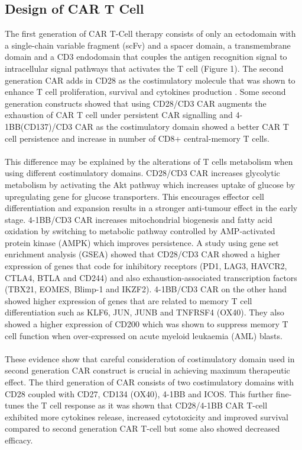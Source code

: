\documentclass[12pt,oneside]{report}
\begin{document}
\subsection{Design of CAR T Cell}
The first generation of CAR T-Cell therapy consists of only an ectodomain with a single-chain variable fragment (scFv) and a spacer domain, a transmembrane domain and a CD3\textzeta{} endodomain that couples the antigen recognition signal to intracellular signal pathways that activates the T cell\citep{CD3} (Figure 1). The second generation CAR adds in CD28 as the costimulatory molecule that was shown to enhance T cell proliferation, survival \citep{survival} and cytokines production \citep{activation}. Some second generation constructs showed that using CD28/CD3\textzeta{} CAR augments the exhaustion of CAR T cell under persistent CAR signalling \citep{exhaustion} and 4-1BB(CD137)/CD3\textzeta{} CAR as the costimulatory domain showed a better CAR T cell persistence and increase in number of CD8+ central-memory T cells\citep{CD28-1, CD28-2, CD28-3, 4-1BB}. 
\\\\This difference may be explained by the alterations of T cells metabolism when using different costimulatory domains\citep{CD28-2}. CD28/CD3\textzeta{} CAR increases glycolytic metabolism by activating the Akt pathway\citep{CD28-5} which increases uptake of glucose by upregulating gene for glucose transporters. This encourages effector cell differentiation and expansion results in a stronger anti-tumour effect in the early stage. 4-1BB/CD3\textzeta{} CAR increases mitochondrial biogenesis and fatty acid oxidation by switching to metabolic pathway controlled by AMP-activated protein kinase (AMPK) which improves persistence\citep{CD28-2}. A study using gene set enrichment analysis (GSEA) showed that CD28/CD3\textzeta{} CAR showed a higher expression of genes that code for inhibitory receptors (PD1, LAG3, HAVCR2, CTLA4, BTLA and CD244) and also exhaustion-associated transcription factors (TBX21, EOMES, Blimp-1 and IKZF2)\citep{CD28-4-1BB-3}. 4-1BB/CD3\textzeta{} CAR on the other hand showed higher expression of genes that are related to memory T cell differentiation such as KLF6, JUN, JUNB and TNFRSF4 (OX40)\citep{CD28-4-1BB-3}. They also showed a higher expression of CD200\citep{CD28-4-1BB-3} which was shown to suppress memory T cell function when over-expressed on acute myeloid leukaemia (AML) blasts\citep{CD200}. 
\\\\These evidence show that careful consideration of costimulatory domain used in second generation CAR construct is crucial in achieving maximum therapeutic effect. The third generation of CAR consists of two costimulatory domains with CD28 coupled with CD27, CD134 (OX40), 4-1BB \citep{CD137} and ICOS. This further fine-tunes the T cell response as it was shown that CD28/4-1BB CAR T-cell exhibited more cytokines release, increased cytotoxicity and improved survival compared to second generation CAR T-cell but some also showed decreased efficacy\citep{CD28-4-1BB-1, CD28-4-1BB-2}. 
\end{document}
